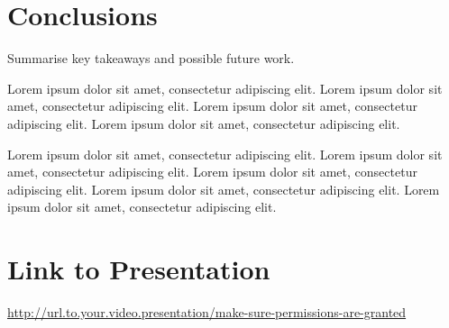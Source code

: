 \documentclass[english]{article}
\begin{document}
\section{Conclusions}
Summarise key takeaways and possible future work.

Lorem ipsum dolor sit amet, consectetur adipiscing elit.
Lorem ipsum dolor sit amet, consectetur adipiscing elit. 
Lorem ipsum dolor sit amet, consectetur adipiscing elit. 
Lorem ipsum dolor sit amet, consectetur adipiscing elit. 

Lorem ipsum dolor sit amet, consectetur adipiscing elit. 
Lorem ipsum dolor sit amet, consectetur adipiscing elit. 
Lorem ipsum dolor sit amet, consectetur adipiscing elit. 
Lorem ipsum dolor sit amet, consectetur adipiscing elit. 
Lorem ipsum dolor sit amet, consectetur adipiscing elit. 

\clearpage

\clearpage



\section*{Link to Presentation}
\href{http://url.to.your.video.presentation/make_sure_permissions_are_granted}{http://url.to.your.video.presentation/make-sure-permissions-are-granted}

\clearpage

\end{document}
